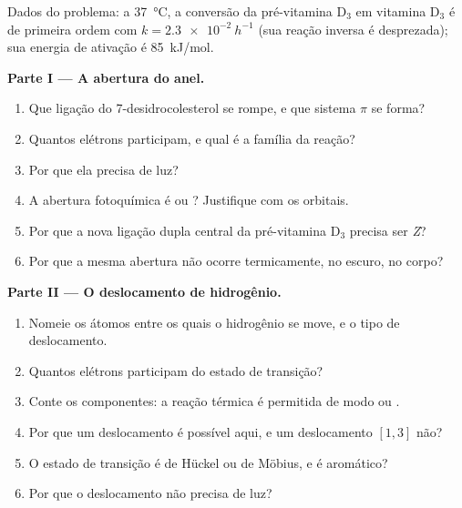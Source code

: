 \begin{problem}
\label{pb:b3:pericyclic:1}
Dados do problema: a \qty{37}{\celsius}, a conversão da pré-vitamina D$_3$ em vitamina D$_3$ é
de primeira ordem com $k = \qty{2.3e-2}{h^{-1}}$ (sua reação inversa é desprezada); sua energia de ativação é
\qty{85}{kJ/mol}.

\medskip\noindent\textbf{Parte I --- A abertura do anel.}
\begin{enumerate}
  \item Que ligação do 7-desidrocolesterol se rompe, e que sistema $\pi$ se forma?
  \item Quantos elétrons participam, e qual é a família da reação?
  \item Por que ela precisa de luz?
  \item A abertura fotoquímica é  ou ? Justifique com os
        orbitais.
  \item Por que a nova ligação dupla central da pré-vitamina D$_3$ precisa ser \textit{Z}?
  \item Por que a mesma abertura não ocorre termicamente, no escuro, no corpo?
\end{enumerate}

\medskip\noindent\textbf{Parte II --- O deslocamento de hidrogênio.}
\begin{enumerate}[resume]
  \item Nomeie os átomos entre os quais o hidrogênio se move, e o tipo de deslocamento.
  \item Quantos elétrons participam do estado de transição?
  \item Conte os componentes: a reação térmica é permitida
        de modo  ou .
  \item Por que um deslocamento  é possível aqui, e um deslocamento $[1,3]$
        não?
  \item O estado de transição é de Hückel ou de Möbius, e é aromático?
  \item Por que o deslocamento não precisa de luz?
\end{enumerate}


\end{problem}
